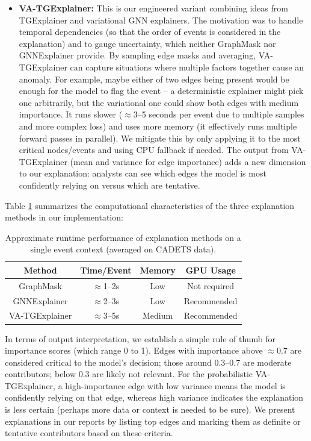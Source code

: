 \documentclass[conference]{IEEEtran}
\begin{document}
\begin{itemize}
    \item \textbf{VA-TGExplainer:} This is our engineered variant combining ideas from TGExplainer and variational GNN explainers. The motivation was to handle temporal dependencies (so that the order of events is considered in the explanation) and to gauge uncertainty, which neither GraphMask nor GNNExplainer provide. By sampling edge masks and averaging, VA-TGExplainer can capture situations where multiple factors together cause an anomaly. For example, maybe either of two edges being present would be enough for the model to flag the event -- a deterministic explainer might pick one arbitrarily, but the variational one could show both edges with medium importance. It runs slower ($\approx$3--5 seconds per event due to multiple samples and more complex loss) and uses more memory (it effectively runs multiple forward passes in parallel). We mitigate this by only applying it to the most critical nodes/events and using CPU fallback if needed. The output from VA-TGExplainer (mean and variance for edge importance) adds a new dimension to our explanation: analysts can see which edges the model is most confidently relying on versus which are tentative.
\end{itemize}

Table \ref{tab1} summarizes the computational characteristics of the three explanation methods in our implementation:

\begin{table}[htbp]
\caption{Approximate runtime performance of explanation methods on a single event context (averaged on CADETS data).}
\begin{center}
\begin{tabular}{|c|c|c|c|}
\hline
\textbf{Method} & \textbf{Time/Event} & \textbf{Memory} & \textbf{GPU Usage} \\
\hline
GraphMask & $\approx$1--2s & Low & Not required \\
\hline
GNNExplainer & $\approx$2--3s & Low & Recommended \\
\hline
VA-TGExplainer & $\approx$3--5s & Medium & Recommended \\
\hline
\end{tabular}
\label{tab1}
\end{center}
\end{table}

In terms of output interpretation, we establish a simple rule of thumb for importance scores (which range 0 to 1). Edges with importance above $\approx$0.7 are considered critical to the model's decision; those around 0.3--0.7 are moderate contributors; below 0.3 are likely not relevant. For the probabilistic VA-TGExplainer, a high-importance edge with low variance means the model is confidently relying on that edge, whereas high variance indicates the explanation is less certain (perhaps more data or context is needed to be sure). We present explanations in our reports by listing top edges and marking them as definite or tentative contributors based on these criteria.
\end{document}

